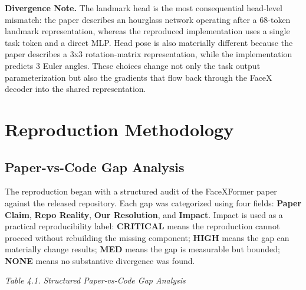 \documentclass[11pt]{article}
\begin{document}
\textbf{Divergence Note.} The landmark head is the most consequential head-level mismatch: the paper describes an hourglass network operating after a 68-token landmark representation, whereas the reproduced implementation uses a single task token and a direct MLP. Head pose is also materially different because the paper describes a 3x3 rotation-matrix representation, while the implementation predicts 3 Euler angles. These choices change not only the task output parameterization but also the gradients that flow back through the FaceX decoder into the shared representation.


\section{Reproduction Methodology}


\subsection{Paper-vs-Code Gap Analysis}


The reproduction began with a structured audit of the FaceXFormer paper against the released repository. Each gap was categorized using four fields: \textbf{Paper Claim}, \textbf{Repo Reality}, \textbf{Our Resolution}, and \textbf{Impact}. Impact is used as a practical reproducibility label: \textbf{CRITICAL} means the reproduction cannot proceed without rebuilding the missing component; \textbf{HIGH} means the gap can materially change results; \textbf{MED} means the gap is measurable but bounded; \textbf{NONE} means no substantive divergence was found.


\emph{Table 4.1. Structured Paper-vs-Code Gap Analysis}
\end{document}
